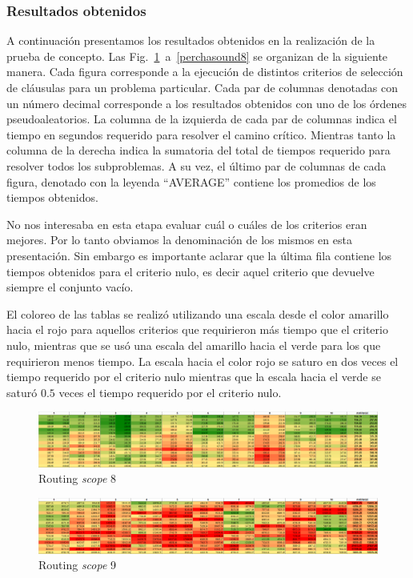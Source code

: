 \subsubsection{Resultados obtenidos}

A continuación presentamos los resultados obtenidos en la realización de la
prueba de concepto. Las Fig.~\ref{perchap8}~a~\ref{perchasound8}  se organizan
de la siguiente manera. Cada figura corresponde a la ejecución de distintos
criterios de selección de cláusulas para un problema particular. Cada par de
columnas denotadas con un número decimal corresponde a los resultados
obtenidos con uno de los órdenes pseudoaleatorios. La columna de la izquierda
de cada par de columnas indica el tiempo en segundos requerido para resolver
el camino crítico. Mientras tanto la columna de la derecha indica la sumatoria
del total de tiempos requerido para resolver todos los subproblemas. A su vez,
el último par de columnas de cada figura, denotado con la leyenda ``AVERAGE''
contiene los promedios de los tiempos obtenidos.

No nos interesaba en esta etapa evaluar cuál o cuáles de los criterios eran
mejores. Por lo tanto obviamos la denominación de los mismos en esta
presentación. Sin embargo es importante aclarar que la última fila contiene
los tiempos obtenidos para el criterio nulo, es decir aquel criterio que
devuelve siempre el conjunto vacío.

El coloreo de las tablas se realizó utilizando una escala desde el color
amarillo hacia el rojo para aquellos criterios que requirieron más tiempo que
el criterio nulo, mientras que se usó una escala del amarillo hacia el verde
para los que requirieron menos tiempo. La escala hacia el color rojo se saturo
en dos veces el tiempo requerido por el criterio nulo mientras que la escala
hacia el verde se saturó $0.5$ veces el tiempo requerido por el criterio nulo.

\begin{figure}
	\includegraphics[width=\textwidth]{resultados/p8_percha.png}
	\caption{Routing \emph{scope} 8}
	\label{perchap8}
\end{figure}

\begin{figure}
	\includegraphics[width=\textwidth]{resultados/p9_percha.png}
	\caption{Routing \emph{scope} 9}
\end{figure}

